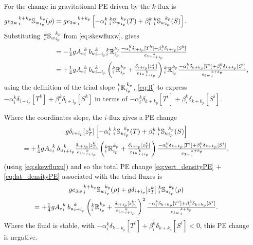 \documentclass[../main/NEMO_manual]{subfiles}
\begin{document}
For the change in gravitational PE driven by the $k$-flux is
\begin{align}
  \label{eq:vert_densityPE}
  g {e_{3w}}_{\,i}^{\,k+k_p}{\mathbb{S}_w}_{i_p}^{k_p} (\rho)
  &=g {e_{3w}}_{\,i}^{\,k+k_p}\left[-\alpha _i^k {\:}_i^k
    {\mathbb{S}_w}_{i_p}^{k_p} (T) + \beta_i^k {\:}_i^k
    {\mathbb{S}_w}_{i_p}^{k_p} (S) \right]. \notag \\
  \intertext{Substituting  ${\:}_i^k {\mathbb{S}_w}_{i_p}^{k_p}$ from \autoref{eq:skewfluxw}, gives}
  &=-\fractext{1}{4} g{A_e}_i^k{\: }{b_u}_{i+i_p}^k {_i^k\tilde{\mathbb{R}}_{i_p}^{k_p}}
    \frac{ -\alpha _i^k\delta_{i+ i_p}[T^k]+ \beta_i^k\delta_{i+ i_p}[S^k]} { {e_{1u}}_{\,i + i_p}^{\,k} } \notag \\
  &=+\fractext{1}{4} g{A_e}_i^k{\: }{b_u}_{i+i_p}^k
    \left({_i^k\mathbb{R}_{i_p}^{k_p}}+\frac{\delta_{i+i_p}[z_T^k]}{{e_{1u}}_{\,i + i_p}^{\,k}}\right) {_i^k\mathbb{R}_{i_p}^{k_p}}
    \frac{-\alpha_i^k \delta_{k+ k_p}[T^i]+ \beta_i^k\delta_{k+ k_p}[S^i]} {{e_{3w}}_{\,i}^{\,k+k_p}},
\end{align}
using the definition of the triad slope ${}_{i}^{k}{\mathbb{R}_{}}_{i_p}^{\,k_p}$, \autoref{eq:R} to
express $-\alpha _i^k\delta_{i+ i_p}[T^k]+\beta_i^k\delta_{i+ i_p}[S^k]$ in terms of
$-\alpha_i^k \delta_{k+ k_p}[T^i]+ \beta_i^k\delta_{k+ k_p}[S^i]$.

Where the coordinates slope, the $i$-flux gives a PE change
\begin{multline}
  \label{eq:lat_densityPE}
  g \delta_{i+i_p}[z_T^k]
  \left[
    -\alpha _i^k {\:}_i^k {\mathbb{S}_u}_{i_p}^{k_p} (T) + \beta_i^k {\:}_i^k {\mathbb{S}_u}_{i_p}^{k_p} (S)
  \right] \\
  = +\textstyle \frac{1}{4} g{A_e}_i^k{\: }{b_u}_{i+i_p}^k
  \frac{\delta_{i+i_p}[z_T^k]}{{e_{1u}}_{\,i + i_p}^{\,k}}
  \left({_i^k\mathbb{R}_{i_p}^{k_p}}+\frac{\delta_{i+i_p}[z_T^k]}{{e_{1u}}_{\,i + i_p}^{\,k}}\right)
  \frac{-\alpha_i^k \delta_{k+ k_p}[T^i]+ \beta_i^k\delta_{k+ k_p}[S^i]} {{e_{3w}}_{\,i}^{\,k+k_p}},
\end{multline}
(using \autoref{eq:skewfluxu}) and so the total PE change \autoref{eq:vert_densityPE} +
\autoref{eq:lat_densityPE} associated with the triad fluxes is
\begin{multline*}
  g{e_{3w}}_{\,i}^{\,k+k_p}{\mathbb{S}_w}_{i_p}^{k_p} (\rho) +
  g\delta_{i+i_p}[z_T^k] {\:}_i^k {\mathbb{S}_u}_{i_p}^{k_p} (\rho) \\
  = +\textstyle \frac{1}{4} g{A_e}_i^k{\: }{b_u}_{i+i_p}^k
  \left({_i^k\mathbb{R}_{i_p}^{k_p}}+\frac{\delta_{i+i_p}[z_T^k]}{{e_{1u}}_{\,i + i_p}^{\,k}}\right)^2
  \frac{-\alpha_i^k \delta_{k+ k_p}[T^i]+ \beta_i^k\delta_{k+ k_p}[S^i]} {{e_{3w}}_{\,i}^{\,k+k_p}}.
\end{multline*}
Where the fluid is stable, with $-\alpha_i^k \delta_{k+ k_p}[T^i]+
\beta_i^k\delta_{k+ k_p}[S^i]<0$, this PE change is negative.
\end{document}
